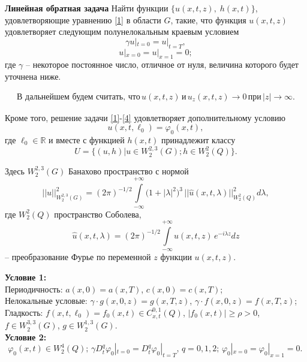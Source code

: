 {\bf Линейная обратная задача} Найти функции $\{u(x,t,z),\; h(x,t)\}$, удовлетворяющие уравнению \eqref{1} в области $G$, такие, что функция $u(x,t,z)$  удовлетворяет следующим полунелокальным краевым условием
\begin{equation} \label{2}
\gamma u|_{t=0}= u|_{t=T},
\end{equation}
\begin{equation} \label{3}
u|_{x=0}=  u|_{x=1}=0;
\end{equation}
где $\gamma $ -- некоторое постоянное число, отличное от нуля,  величина которого будет уточнена ниже.

\begin{equation} \label{4}
\begin{array}{c}
\text{В дальнейшем будем считать, что}\, u(x,t,z)\, \text{и}\, u_{z}(x,t,z)\rightarrow 0 \,  \text{при} \, \left|z\right|\rightarrow \infty.
\end{array}
\end{equation}

Кроме того, решение задачи \eqref{1}-\eqref{4}  удовлетворяет дополнительному условию
\begin{equation} \label{5}
u(x,t,\ell_{0})=\varphi _{0}(x,t),
\end{equation}
где $\ell_{0}\in \mathbb{R}$ и вместе с функцией  $h(x,t)$ принадлежит классу
$$U=\{(u,h)|u\in W_{2}^{2,3}(G);h\in W_{2}^{2}(Q)\}.$$

Здесь $W_{2}^{2,3} (G)$ Банахово пространство с нормой
$$||u||^{2}_{W_{2}^{2,3}(G)}=(2\pi)^{-1/2}\int\limits_{-\infty}^{+\infty}\big(1+|\lambda|^{2}\big)^{3}\, ||\hat{u}(x,t,\lambda)||^{2}_{W_{2}^{2}(Q)} d \lambda,    $$
где $W_{2}^{2} (Q)$ пространство Соболева,
$$\hat{u}(x,t,\lambda )=(2\pi )^{-1/2} \int\limits_{-\infty }^{+\infty }u(x,t,z)\,  e^{-i\lambda z} dz$$
-- преобразование Фурье по переменной $z$ функции $u(x,t,z)$.

{\bf Условие 1:} \\
Периодичность: $a(x,0)=a(x,T)$, $c(x,0)=c(x,T)$;\\
Нелокальные условые:  $\gamma \cdot g(x,0,z)=g(x,T,z)$, $\gamma \cdot f(x,0,z)=f(x,T,z)$;\\
Гладкость: $f(x,t,\ell_{0})=f_{0}(x,t)\in C_{x,t}^{0,1}(Q)$, $|f_{0}(x,t)|\geq \rho >0$, $f\in W_{2}^{3,3}(G)$, $g\in W_{2}^{1,3}(G) $.\\

{\bf Условие 2:} \\
$$\varphi _{0}(x,t)\in W_{2}^{4}(Q);\, \gamma D_{t}^{q}\varphi_{0}|_{t=0}=D_{t}^{q}\varphi _{0}|_{t=T},\, q=0,1,2;\,\varphi_{0}|_{x=0}=\varphi _{0}|_{x=1}=0.\,$$

